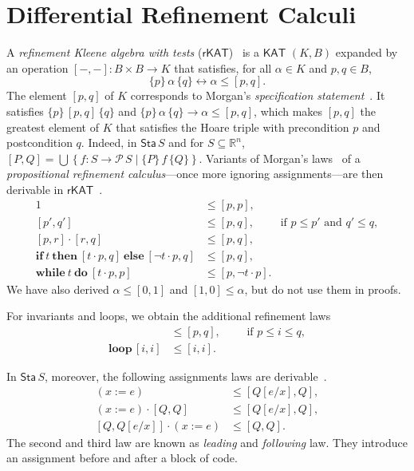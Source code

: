 \documentclass[envcountsame,envcountsect]{llncs}
\newcommand{\IF}[3]{\mathbf{if}\ #1\ \mathbf{then}\ #2\ \mathbf{else}\ #3}
\newcommand{\WHILE}[2]{\mathbf{while}\ #1\ \mathbf{do}\ #2}
\newcommand{\KAT}{\mathsf{KAT}}
\newcommand{\rKAT}{\mathsf{rKAT}}
\newcommand{\Pow}{\mathcal{P}}
\newcommand{\reals}{\mathbb{R}}
\newcommand{\sta}{\mathsf{Sta}}
\begin{document}

\section{Differential Refinement Calculi}\label{sec:refine}

A \emph{refinement Kleene algebra with tests}
($\rKAT$)~\cite{ArmstrongGS16}  is a $\KAT$
$(K,B)$ expanded by an operation $[-,-]:B\times B\to K$ that
satisfies, for all $\alpha \in K$ and $p,q\in B$, 
\begin{equation*}
  \{p\}\, \alpha\, \{q\} \leftrightarrow \alpha\le [p,q].
\end{equation*}
The element $[p,q]$ of $K$ corresponds to Morgan's \emph{specification
  statement}~\cite{Morgan94}. It satisfies $\{p\}\, [p,q]\, \{q\}$
and $\{p\}\, \alpha\, \{q\} \rightarrow \alpha\le [p,q]$, 
which makes $[p,q]$ the greatest element of $K$ that satisfies the Hoare
triple with precondition $p$ and postcondition $q$.  Indeed, in
$\sta\, S$ and for $S\subseteq \reals^n$,
$ [P,Q] = \bigcup \left\{f:S\to \Pow\, S \mid \{P\}\, f\,
  \{Q\}\right\}$. Variants of Morgan's laws~\cite{Morgan94} of a \emph{propositional
  refinement calculus}---once more ignoring assignments---are then derivable in
$\rKAT$~\cite{ArmstrongGS16}.
\begin{align}
  1 &\le [p,p],\label{eq:r-skip}\tag{r-skip}\\
[p',q'] &\le [p,q],\qquad \text{ if } p\le p'\text{ and } q'\le q,\label{eq:r-cons}\tag{r-cons}\\
[p,r]\cdot [r,q] &\le [p,q],\label{eq:r-seq}\tag{r-seq}\\
\IF{t}{[t\cdot p,q]}{[\neg t\cdot p,q]} &\le [p,q],\label{eq:r-cond}\tag{r-cond}\\
 \WHILE{t}{[t\cdot p,p]} &\le [p,\neg t\cdot p]. \label{eq:r-while}\tag{r-while}
\end{align}
We have also derived $\alpha \le [0,1]$ and $[1,0] \le \alpha$, but do
not use them in proofs.

For invariants and loops, we obtain the additional refinement laws
\begin{align}
  [i,i] &\le [p,q],\qquad \text{ if } p\le i \le q,\label{eq:r-inv}\tag{r-inv}\\
\mathbf{loop}\, [i,i] &\le [i,i]. \label{eq:r-loop}\tag{r-loop}
\end{align}

In $\sta\, S$, moreover, the following assignments laws are
derivable~\cite{ArmstrongGS16}.
\begin{align}
 (x := e)  &\le  \left[Q[e/x],Q\right],\label{eq:r-assgn}\tag{r-assgn}\\
(x:= e) \cdot \left[Q,Q\right] &\le [Q[e/x],Q],\label{eq:r-assgn}\tag{r-assgnl}\\
\left[Q,Q[e/x]\right]\cdot (x:=e) &\le [Q,Q]. \label{eq:r-assgn}\tag{r-assgnf}
\end{align}
The second and third law are known as \emph{leading} and \emph{following}
law. They introduce an assignment before and after a block of code. 
\end{document}
